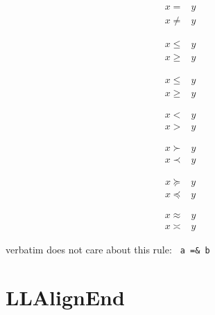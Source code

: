 \documentclass[a4paper]{article}
\begin{document}
\begin{center}
	\begin{minipage}{.1\columnwidth}
		\begin{align*}
			x
			=
			 &
			y
			\\
			x
			\neq
			 &
			y
		\end{align*}
	\end{minipage}%
	\begin{minipage}{.1\columnwidth}
		\begin{equation*}
			\begin{split}
				x \leq & y \\
				x \geq & y
			\end{split}
		\end{equation*}
	\end{minipage}%
	\begin{minipage}{.1\columnwidth}
		\begin{align*}
			x \le & y \\
			x \ge & y
		\end{align*}
	\end{minipage}%
	\begin{minipage}{.1\columnwidth}
		\begin{align*}
			x < & y \\
			x > & y
		\end{align*}
	\end{minipage}
	\begin{minipage}{.1\columnwidth}
		\begin{align*}
			x \succ & y \\
			x \prec & y
		\end{align*}
	\end{minipage}
	\begin{minipage}{.1\columnwidth}
		\begin{align*}
			x \succeq & y \\
			x \preceq & y
		\end{align*}
	\end{minipage}
	\begin{minipage}{.1\columnwidth}
		\begin{align*}
			x \approx & y \\
			x \asymp  & y
		\end{align*}
	\end{minipage}
\end{center}

verbatim does not care about this rule: \verb| a =& b |

\section{LLAlignEnd}
\end{document}
